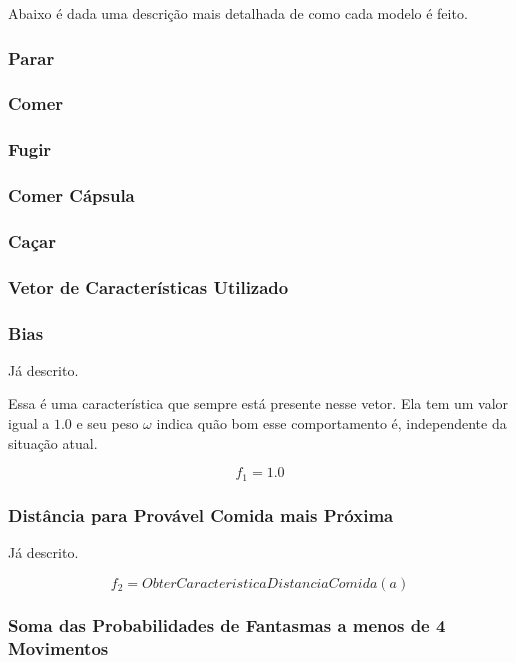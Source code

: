 Abaixo é dada uma descrição mais detalhada de como cada modelo é feito.

\subsubsection*{Parar}

\subsubsection*{Comer}

\subsubsection*{Fugir}

\subsubsection*{Comer Cápsula}

\subsubsection*{Caçar}

\subsubsection{Vetor de Características Utilizado}

\subsubsection*{Bias}

Já descrito.

Essa é uma característica que sempre está presente nesse vetor. Ela tem um valor igual a $ 1.0 $ e seu peso $ \omega $ indica quão bom esse comportamento é, independente da situação atual.

$$ f_1 = 1.0 $$

\subsubsection*{Distância para Provável Comida mais Próxima}

Já descrito.

$$ f_2 = ObterCaracteristicaDistanciaComida \left( a \right) $$

\subsubsection*{Soma das Probabilidades de Fantasmas a menos de 4 Movimentos}

